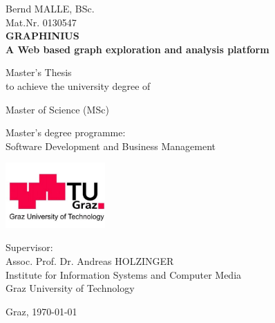 
\begin{center}

{\large Bernd MALLE, BSc.} \\
{\large Mat.Nr. 0130547} \\
\vspace{1cm}
{\LARGE \textbf
{
GRAPHINIUS\\ A Web based graph exploration and analysis platform\\
}
}
\vspace{2cm}

{\larger
Master's Thesis \\[1ex]
to achieve the university degree of

Master of Science (MSc)

Master's degree programme:\\ 
Software Development and Business Management

}

\end{center}

\vspace{1cm}

\begin{center}
\includegraphics[height=2.5cm]{images/tuglogo}

\vspace{2cm} %

{
Supervisor:\\
Assoc. Prof. Dr. Andreas HOLZINGER\\

Institute for Information Systems and Computer Media\\
Graz University of Technology


}
\vspace{1cm}

{
Graz, \today \\
}

\end{center}






